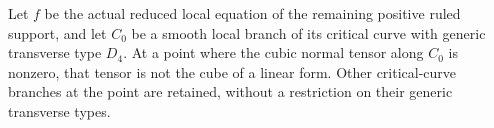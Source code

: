 
\begin{proposition}[P4R.19]\hypertarget{tag-02YC}{}\label{night:P4R.19}\label{stmt:P4R.19}


Let $f$ be the actual reduced local equation of the remaining
positive ruled support, and let $C_0$ be a smooth local branch
of its critical curve with generic transverse type $D_4$.
At a point where the cubic normal tensor along $C_0$ is
nonzero, that tensor is not the cube of a linear form.
Other critical-curve branches at the point are retained,
without a restriction on their generic transverse types.
\end{proposition}


